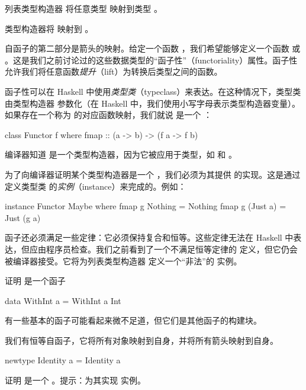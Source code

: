 \documentclass[DaoFP]{subfiles}
\begin{document}
列表类型构造器  将任意类型  映射到类型 。

 类型构造器将  映射到 。

自函子的第二部分是箭头的映射。给定一个函数 ，我们希望能够定义一个函数  或 。这是我们之前讨论过的这些数据类型的“函子性”（functoriality）属性。函子性允许我们将任意函数\emph{提升}（lift）为转换后类型之间的函数。

函子性可以在 Haskell 中使用\emph{类型类}（typeclass）来表达。在这种情况下，类型类由类型构造器  参数化（在 Haskell 中，我们使用小写字母表示类型构造器变量）。如果存在一个称为  的对应函数映射，我们就说  是一个 ：
\begin{haskell}
class Functor f where
  fmap :: (a -> b) -> (f a -> f b)
\end{haskell}
编译器知道  是一个类型构造器，因为它被应用于类型，如  和 。

为了向编译器证明某个类型构造器是一个 ，我们必须为其提供  的实现。这是通过定义类型类  的\emph{实例}（instance）来完成的。例如：
\begin{haskell}
instance Functor Maybe where
  fmap g Nothing  = Nothing
  fmap g (Just a) = Just (g a)
\end{haskell}

函子还必须满足一些定律：它必须保持复合和恒等。这些定律无法在 Haskell 中表达，但应由程序员检查。我们之前看到了一个不满足恒等定律的  定义，但它仍会被编译器接受。它将为列表类型构造器 \hask{[]} 定义一个“非法”的  实例。

\begin{exercise}
证明  是一个函子
\begin{haskell}
data WithInt a = WithInt a Int
\end{haskell}
\end{exercise}

有一些基本的函子可能看起来微不足道，但它们是其他函子的构建块。

我们有恒等自函子，它将所有对象映射到自身，并将所有箭头映射到自身。
\begin{haskell}
newtype Identity a = Identity a
\end{haskell}
\begin{exercise}
证明  是一个 。提示：为其实现  实例。
\end{exercise}
\end{document}
